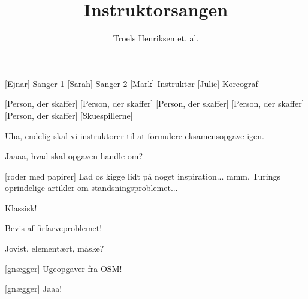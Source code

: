 \documentclass[a4paper,11pt]{article}
\title{Instruktorsangen}
\author{Troels Henriksen et. al.}
\begin{document}
\maketitle

\begin{roles}
[Ejnar] Sanger 1
[Sarah] Sanger 2
[Mark] Instruktør
[Julie] Koreograf
\end{roles}

\begin{props}
[Person, der skaffer]
[Person, der skaffer]
[Person, der skaffer]
[Person, der skaffer]
[Person, der skaffer]
[Skuespillerne]
\end{props}

\begin{sketch}

   Uha, endelig skal vi instruktorer til at formulere
  eksamensopgave igen.

   Jaaaa, hvad skal opgaven handle om?

  [roder med papirer] Lad os kigge lidt på noget
  inspiration... mmm, Turings oprindelige artikler om
  standsningsproblemet...

   Klassisk!

   Bevis af firfarveproblemet!

   Jovist, elementært, måske?

  [gnægger] Ugeopgaver fra OSM!

  [gnægger] Jaaa!
\end{sketch}
\end{document}
